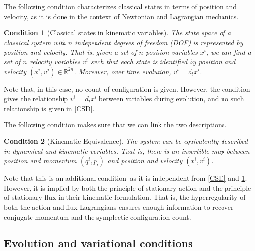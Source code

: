 \documentclass[12pt]{article}
\newtheorem{condth}{Condition}
\renewcommand*{\thecondth}{\Roman{condth}}
\newenvironment{condition}[2][]{\renewcommand{\thecondth}{#2}\begin{condth}[#1]\label{#2}}{\end{condth}\renewcommand{\thecondth}{\Roman{condth}}}
\begin{document}
The following condition characterizes classical states in terms of position and velocity, as it is done in the context of Newtonian and Lagrangian mechanics.
\begin{condition}[Classical states in kinematic variables]{CSK}
	The state \linebreak space of a classical system with $n$ independent degrees of freedom (DOF) is represented by position and velocity. That is, given a set of $n$ position variables $x^i$, we can find a set of $n$ velocity variables $v^i$ such that each state is identified by position and velocity $(x^i,v^j) \in \mathbb{R}^{2n}$. Moreover, over time evolution, $v^i = d_t x^i$.
\end{condition}
Note that, in this case, no count of configuration is given. However, the condition gives the relationship $v^i = d_t x^i$ between variables during evolution, and no such relationship is given in \ref{CSD}.

The following condition makes sure that we can link the two descriptions.
\begin{condition}[Kinematic Equivalence]{KE}
	The system can be equivalently described in dynamical and kinematic variables. That is, there is an invertible map between position and momentum $(q^i, p_i)$ and position and velocity $(x^i, v^i)$.
\end{condition}
Note that this is an additional condition, as it is independent from \ref{CSD} and \ref{CSK}. However, it is implied by both the principle of stationary action and the principle of stationary flux in their kinematic formulation. That is, the hyperregularity of both the action and flux Lagrangians ensures enough information to recover conjugate momentum and the symplectic configuration count.

\subsection{Evolution and variational conditions}
\end{document}
